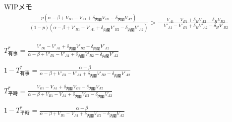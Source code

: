 \documentclass[main.tex]{subfiles}
\begin{document}
WIPメモ
\begin{align*}
    \frac{ p( \alpha-\beta + V_{B1}-V_{A1} + \delta_{内閣}V_{B2} - \delta_{内閣}V_{A2} ) }{ (1-p)( \alpha-\beta + V'_{B1}-V'_{A1} + \delta_{内閣}V'_{B2} - \delta_{内閣}V'_{A2} ) }    >    - \frac{ V_{A1} - V_{B1} + \delta_H V_{A2} - \delta_H V_{B2} }{ V'_{A1} -V'_{B1} + \delta_H V'_{A2} - \delta_H V'_{B2} } \\[1em]
\end{align*}




\begin{definition} \Large$T^*_{有事} = \frac{ V'_{B1} - V'_{A1} +\delta_{内閣}V'_{B2} - \delta_{内閣}V'_{A2} }{ \alpha-\beta + V'_{B1}-V'_{A1} + \delta_{内閣}V'_{B2} - \delta_{内閣}V'_{A2} }$ \end{definition}

\begin{definition} \Large$1 - T^*_{有事} = \frac{ \alpha-\beta }{ \alpha-\beta + V'_{B1}-V'_{A1} + \delta_{内閣}V'_{B2} - \delta_{内閣}V'_{A2} }$ \end{definition}


\begin{definition} \Large$T^*_{平時} = \frac{ V_{B1} - V_{A1} +\delta_{内閣}V_{B2} - \delta_{内閣}V_{A2} }{ \alpha-\beta + V_{B1}-V_{A1} + \delta_{内閣}V_{B2} - \delta_{内閣}V_{A2} }$ \end{definition}

\begin{definition} \Large$1 - T^*_{平時} = \frac{ \alpha-\beta }{ \alpha-\beta + V_{B1}-V_{A1} + \delta_{内閣}V_{B2} - \delta_{内閣}V_{A2} }$ \end{definition}





\theendnotes
\end{document}
